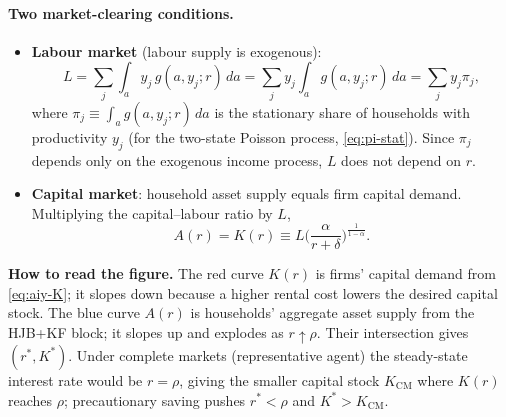 \paragraph{Two market-clearing conditions.}
\begin{itemize}
  \item \textbf{Labour market} (labour supply is exogenous):
  \begin{equation}\label{eq:aiy-L}
    L=\sum_j\int_a y_j\,g(a,y_j;r)\,da=\sum_j y_j\int_a g(a,y_j;r)\,da=\sum_j y_j\pi_j,
  \end{equation}
  where $\pi_j\equiv\int_a g(a,y_j;r)\,da$ is the stationary share of households with productivity $y_j$ (for the two-state Poisson process, \eqref{eq:pi-stat}). Since $\pi_j$ depends only on the exogenous income process, $L$ does not depend on $r$.
  \item \textbf{Capital market}: household asset supply equals firm capital demand. Multiplying the capital--labour ratio by $L$,
  \begin{equation}\label{eq:aiy-K}
    A(r)=K(r)\equiv L\Big(\frac{\alpha}{r+\delta}\Big)^{\frac{1}{1-\alpha}}.
  \end{equation}
\end{itemize}

\begin{center}
\end{center}
\textbf{How to read the figure.} The red curve $K(r)$ is firms' capital demand from \eqref{eq:aiy-K}; it slopes down because a higher rental cost lowers the desired capital stock. The blue curve $A(r)$ is households' aggregate asset supply from the HJB+KF block; it slopes up and explodes as $r\uparrow\rho$. Their intersection gives $(r^*,K^*)$. Under complete markets (representative agent) the steady-state interest rate would be $r=\rho$, giving the smaller capital stock $K_{\text{CM}}$ where $K(r)$ reaches $\rho$; precautionary saving pushes $r^*<\rho$ and $K^*>K_{\text{CM}}$.


